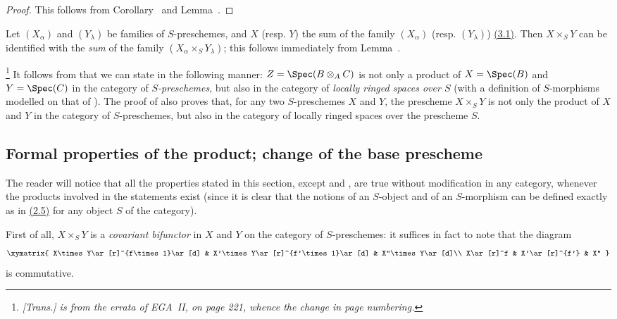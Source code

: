 \begin{proof}
This follows from Corollary~ and Lemma~.
\end{proof}

\begin{env}[3.2.8]
\label{I.3.2.8}
Let $(X_\alpha)$ and $(Y_\lambda)$ be families of $S$-preschemes, and $X$ (resp. $Y$) the sum
of the family $(X_\alpha)$ (resp. $(Y_\lambda)$) \hyperref[subsection:I.3.1]{(3.1)}.
Then $X\times_S Y$ can be identified with the \emph{sum} of the family $(X_\alpha\times_S Y_\lambda)$; this follows immediately from Lemma~.
\end{env}

\begin{env}[3.2.9]
\label{I.3.2.9}
\footnote{\emph{[Trans.]  is from the errata of EGA~II, on page 221, whence the change in page numbering.}}
It follows from  that we can state  in the following
manner: $Z=\Spec(B\otimes_A C)$ is not only a product of $X=\Spec(B)$ and $Y=\Spec(C)$ in the
category of \emph{$S$-preschemes}, but also in the category of \emph{locally ringed spaces
over $S$} (with a definition of $S$-morphisms modelled on that of ). The
proof of  also proves that, for any two $S$-preschemes $X$ and $Y$, the
prescheme $X\times_S Y$ is not only the product of $X$ and $Y$ in the category of
$S$-preschemes, but also in the category of locally ringed spaces over the prescheme $S$.
\end{env}

\subsection{Formal properties of the product; change of the base prescheme}
\label{subsection:I.3.3}

\begin{env}[3.3.1]
\label{I.3.3.1}
The reader will notice that all the properties stated in this section, except
 and , are true without modification in any
category, whenever the products involved in the statements exist (since it is
clear that the notions of an $S$-object and of an $S$-morphism can be defined
exactly as in \hyperref[subsection:I.2.5]{(2.5)} for any object $S$ of the category).
\end{env}

\begin{env}[3.3.2]
\label{I.3.3.2}
First of all, $X\times_S Y$ is a \emph{covariant bifunctor} in $X$ and $Y$ on the
category of $S$-preschemes: it suffices in fact to note that the diagram
\[
  \xymatrix{
    X\times Y\ar[r]^{f\times 1}\ar[d] &
    X'\times Y\ar[r]^{f'\times 1}\ar[d] &
    X''\times Y\ar[d]\\
    X\ar[r]^f &
    X'\ar[r]^{f'} &
    X''
  }
\]
is commutative.
\end{env}

